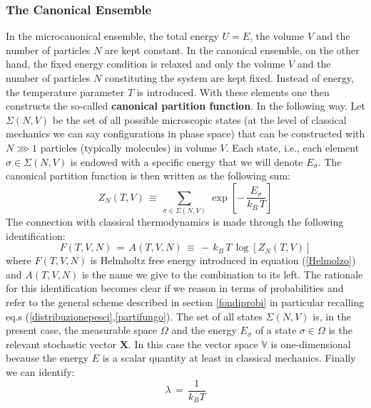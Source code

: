 \documentclass[10pt,a4paper]{article}
\begin{document}
\subsubsection{The Canonical Ensemble}
\label{insiememedio} In the microcanonical ensemble, the total energy $U=E$, the volume $V$  and the number of particles $N$ are kept constant.  In the canonical ensemble, on the other hand, the fixed energy condition is relaxed and only the volume $V$ and the number of particles $N$ constituting the system are kept fixed. Instead of energy, the temperature parameter $T$ is introduced.  With these elements one then constructs the so-called \textbf{canonical partition function}. In the following way.
Let $\Sigma(N,V)$  be the set of all possible microscopic states (at the level of classical mechanics we can say configurations in phase space) that can be constructed with $N\ggg 1$ particles (typically molecules) in volume $V$. Each state, i.e., each element $\sigma \in \Sigma(N,V)$ is endowed with a specific energy that we will denote $E_\sigma$. The canonical partition function is then written as the following sum:
\begin{equation}\label{canpartfun}
    Z_N\left(T,V\right)\, \equiv \, \sum_{\sigma\in\Sigma(N,V)} \,
    \exp \left[ - \,\frac{E_\sigma}{k_B \, T}\right]
\end{equation}
The connection with classical thermodynamics is made through the following identification:
\begin{equation}\label{interpretocanonico}
  F\left(T,V,N\right) \, =\,  A\left(T,V,N\right) \, \equiv \, -\, k_B \, T \, \log
    \left[Z_N\left(T,V\right)\right]
\end{equation}
where $F\left(T,V,N\right)$  is  Helmholtz free energy introduced in equation (\ref{Helmolzo}) and $A\left(T,V,N\right)$
is the name we give to the combination to its left.
The rationale for this identification becomes clear if we reason in terms of probabilities and refer to the general scheme described in section \ref{fondiprobi} in particular
recalling eq.s (\ref{distribuzionepesci},\ref{partifungo}).
The set of all states $\Sigma(N,V)$ is, in the present case, the measurable space $\Omega$ and the energy $E_\sigma$ of a state
$\sigma \in \Omega$ is  the relevant stochastic vector $\mathbf{X}$.
In this case the vector space $\mathbb{V}$ is
one-dimensional because the energy $E$ is a scalar quantity
at least in classical mechanics. Finally we can identify:
\begin{equation}\label{agniscolambdo}
    \lambda \, = \, \frac{1}{k_B T}
\end{equation}
\end{document}

